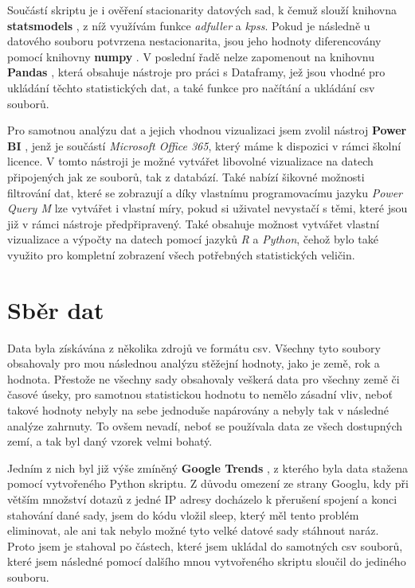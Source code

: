 \documentclass[thesis=M,czech]{FITthesis}[2022/10/08]
\begin{document}
Součástí skriptu je i ověření stacionarity datových sad, k čemuž slouží knihovna \textbf{statsmodels} \cite{stat}, z níž využívám funkce \textit{adfuller} a \textit{kpss}. Pokud je následně u datového souboru potvrzena nestacionarita, jsou jeho hodnoty diferencovány pomocí knihovny  \textbf{numpy} \cite{numpy}. V poslední řadě nelze zapomenout na knihovnu \textbf{Pandas} \cite{pandas}, která obsahuje nástroje pro práci s Dataframy, jež jsou vhodné pro ukládání těchto statistických dat, a také funkce pro načítání a ukládání csv souborů.

Pro samotnou analýzu dat a jejich vhodnou vizualizaci jsem zvolil nástroj \textbf{Power BI} \cite{powerbi}, jenž je součástí \textit{Microsoft Office 365}, který máme k dispozici v rámci školní licence. V tomto nástroji je možné vytvářet libovolné vizualizace na datech připojených jak ze souborů, tak z databází. Také nabízí šikovné možnosti filtrování dat, které se zobrazují a díky vlastnímu programovacímu jazyku \textit{Power Query M} lze vytvářet i vlastní míry, pokud si uživatel nevystačí s těmi, které jsou již v rámci nástroje předpřipravený. Také obsahuje možnost vytvářet vlastní vizualizace a výpočty na datech pomocí jazyků \textit{R} a \textit{Python}, čehož bylo také využito pro kompletní zobrazení všech potřebných statistických veličin.

\section{Sběr dat}

Data byla získávána z několika zdrojů ve formátu csv. Všechny tyto soubory obsahovaly pro mou následnou analýzu stěžejní hodnoty, jako je země, rok a hodnota. Přestože ne všechny sady obsahovaly veškerá data pro všechny země či časové úseky, pro samotnou statistickou hodnotu to nemělo zásadní vliv, neboť takové hodnoty nebyly na sebe jednoduše napárovány a nebyly tak v následné analýze zahrnuty. To ovšem nevadí, neboť se používala data ze všech dostupných zemí, a tak byl daný vzorek velmi bohatý. 

Jedním z nich byl již výše zmíněný \textbf{Google Trends} \cite{google}, z kterého byla data stažena pomocí vytvořeného Python skriptu. Z důvodu omezení ze strany Googlu, kdy při větším množství dotazů z jedné IP adresy docházelo k přerušení spojení a konci stahování dané sady, jsem do kódu vložil sleep, který měl tento problém eliminovat, ale ani tak nebylo možné tyto velké datové sady stáhnout naráz. Proto jsem je stahoval po částech, které jsem ukládal do samotných csv souborů, které jsem následné pomocí dalšího mnou vytvořeného skriptu sloučil do jediného souboru. 
\end{document}
